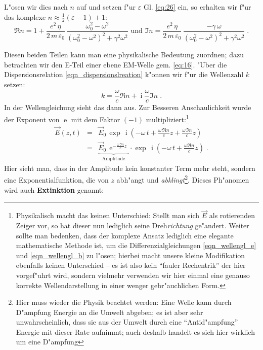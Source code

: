 \documentclass[twoside,a4paper]{book}
\newcommand{\E}{\ensuremath{\operatorname{e}}}
\newcommand{\I}{\ensuremath{\operatorname{i}}}
\begin{document}
L"osen wir dies nach $n$ auf und setzen f"ur $\varepsilon$
Gl. \eqref{eq:26} ein, so erhalten wir f"ur das komplexe $n \approx
\frac{1}{2}(\varepsilon-1) + 1$:
\begin{equation}
   \label{eq:28}
   \Re n = 1 + \frac{e^2 \, \eta}{2\, m \, \varepsilon_0} \, \frac{\omega_0^2 - \omega^2}{(\omega_0^2 - \omega^2)^2 +
     \gamma^2 \omega^2} \text{ und }
\Im n = \frac{e^2 \, \eta}{2\, m \, \varepsilon_0} \, \frac{- \gamma \, \omega}{{(\omega_0^2 - \omega^2)^2 +
     \gamma^2 \omega^2}} \;.
\end{equation}

Diesen beiden Teilen kann man eine physikalische Bedeutung
zuordnen; dazu betrachten wir den E-Teil einer ebene EM-Welle
gem. \eqref{eq:16}. "Uber die Dispersionsrelation
\eqref{eqn_dispersionslreation} k"onnen wir f"ur die Wellenzahl $k$
setzen:
\begin{equation*}
   k = \frac{\omega}{c} \Re n + \I \frac{ \omega }{c} \Im n \;.
\end{equation*}
In der Wellengleichung sieht das dann aus. Zur Besseren
Anschaulichkeit wurde der Exponent von $\E$ mit dem Faktor $(-1)$
multipliziert:\footnote{Physikalisch macht das keinen Unterschied: Stellt man
sich $\vec E$ als rotierenden Zeiger vor, so hat dieser nun lediglich
seine Dreh\emph{richtung} ge"andert. Weiter sollte man bedenken, dass
der komplexe Ansatz lediglich eine elegante mathematische Methode ist,
um die Differenzialgleichungen \eqref{eqn_wellengl_e} und
\eqref{eqn_wellengl_b} zu l"osen; hierbei macht unsere kleine
Modifikation ebenfalls keinen Unterschied -- es ist also kein "`fauler
Rechentrik"' der hier vorgef"uhrt wird, sondern vielmehr verwenden wir
hier einmal eine genauso korrekte Wellendarstellung in einer wenger
gebr"auchlichen Form.}
\begin{eqnarray*}
   \vec E(z,t) &=& \vec E_0 \, \exp \,{\I \left ( -\omega \, t + \frac{\omega \, \Re n}{c} z
     + \frac{\omega \, \Im n}{c} z\right )} \\
&=& \underbrace{ \vec E_0 \, \E^{- \frac{\omega \, \Im n}{c} z}
}_\text{Amplitude} \cdot \exp \, \I \left ( - \omega \, t + \frac{\omega
   \Re n}{c}z \right ) \;.
\end{eqnarray*}
Hier sieht man, dass in der Amplitude kein konstanter Term mehr steht,
sondern eine Exponentialfunktion, die von $z$ abh"angt und
\emph{abklingt}\footnote{Hier muss wieder die Physik beachtet werden:
  Eine Welle kann durch D"ampfung Energie an die Umwelt abgeben; es
  ist aber sehr unwahrscheinlich, dass sie aus der Umwelt durch eine
  "`Antid"ampfung"' Energie mit dieser Rate aufnimmt; auch deshalb
  handelt es sich hier wirklich um eine D"ampfung}. Dieses Ph"anomen wird
auch \textbf{Extinktion} genannt:
\end{document}
